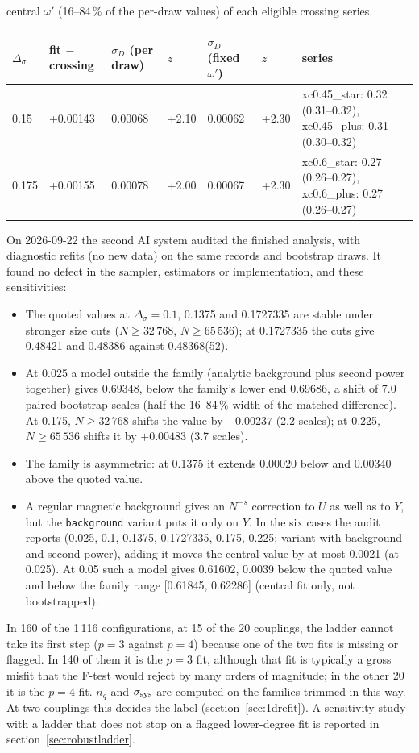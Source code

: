 \documentclass[10pt,a4paper]{article}
\newcommand{\Ds}{\Delta_\sigma}
\newcommand{\code}[1]{\texttt{#1}}
\newcommand{\ssys}{\sigma_{\rm sys}}
\begin{document}
\begin{description}[leftmargin=1.2em]
\begin{table}[htbp]
{central $\omega'$ (16--84\,\% of the per-draw values) of each eligible crossing series.}\label{tab:oned}
\begin{tabular}{@{}llllll>{\raggedright\arraybackslash}p{5.0cm}@{}}\toprule
$\Ds$ & fit $-$ crossing & $\sigma_D$ (per draw) & $z$ & $\sigma_D$ (fixed $\omega'$) & $z$ & series \\\midrule
0.15 & +0.00143 & 0.00068 & +2.10 & 0.00062 & +2.30 & xc0.45\_star: 0.32 (0.31--0.32), xc0.45\_plus: 0.31 (0.30--0.32) \\
0.175 & +0.00155 & 0.00078 & +2.00 & 0.00067 & +2.30 & xc0.6\_star: 0.27 (0.26--0.27), xc0.6\_plus: 0.27 (0.26--0.27) \\
\bottomrule\end{tabular}
\end{table}
\item[Audit.] On 2026-09-22 the second AI system audited the finished analysis, with diagnostic refits
 (no new data) on the same records and bootstrap draws. It found no defect in the sampler, estimators or implementation, and these
 sensitivities:
 \begin{itemize}
 \item The quoted values at $\Ds=0.1$, 0.1375 and 0.1727335 are stable under stronger size cuts ($N\ge32\,768$, $N\ge65\,536$); at
  0.1727335 the cuts give 0.48421 and 0.48386 against 0.48368(52).
 \item At 0.025 a model outside the family (analytic background plus second power together) gives 0.69348, below the family's lower end
  0.69686, a shift of 7.0 paired-bootstrap scales (half the 16--84\,\% width of the matched difference). At 0.175, $N\ge32\,768$ shifts the
  value by $-0.00237$ (2.2 scales); at 0.225, $N\ge65\,536$ shifts it by $+0.00483$ (3.7 scales).
 \item The family is asymmetric: at 0.1375 it extends $0.00020$ below and $0.00340$ above the quoted value.
 \item A regular magnetic background gives an $N^{-s}$ correction to $U$ as well as to $Y$, but the \code{background} variant puts it only on
  $Y$. In the six cases the audit reports (0.025, 0.1, 0.1375, 0.1727335, 0.175, 0.225; variant with background and second power),
  adding it moves the central value by at most 0.0021 (at 0.025). At 0.05 such a model gives 0.61602, 0.0039 below the quoted value and below
  the family range [0.61845, 0.62286] (central fit only, not bootstrapped).
 \end{itemize}
\item[The degree ladder.] In 160 of the 1\,116 configurations, at 15 of the 20 couplings, the ladder cannot take its first step ($p=3$
 against $p=4$) because one of the two fits is missing or flagged. In 140 of them it is the $p=3$ fit, although that fit is typically a gross
 misfit that the F-test would reject by many orders of magnitude; in the other 20 it is the $p=4$ fit. $n_q$ and $\ssys$ are computed on the
 families trimmed in this way. At two couplings this decides the label (section~\ref{sec:1drefit}). A sensitivity study with a ladder
 that does not stop on a flagged lower-degree fit is reported in section~\ref{sec:robustladder}.
\end{description}
\end{document}
